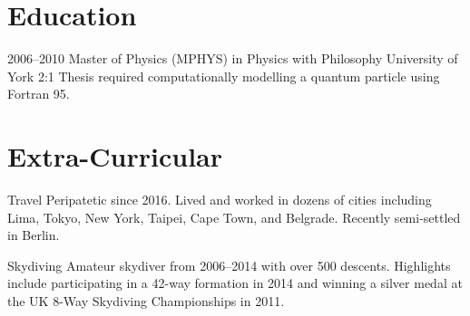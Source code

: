 \documentclass[11pt, a4paper, sans]{moderncv}
\begin{document}
\section{Education}

\cventry
  {2006--2010}
  {Master of Physics (\small{MPHYS}) in Physics with Philosophy}
  {University of York}
  {}
  {2:1}
  {
    Thesis required computationally modelling a quantum particle using Fortran 95.
  }

\section{Extra-Curricular}

\cvitem
  {Travel}
  {
    Peripatetic since 2016. Lived and worked in dozens of cities including Lima, Tokyo, New York, Taipei, Cape Town, and Belgrade. Recently semi-settled in Berlin.
  }

\vspace*{3mm}

\cvitem
  {Skydiving}
  {
    Amateur skydiver from 2006--2014 with over 500 descents. Highlights include participating in a 42-way formation in 2014 and winning a silver medal at the UK 8-Way Skydiving Championships in 2011.
  }
\end{document}
